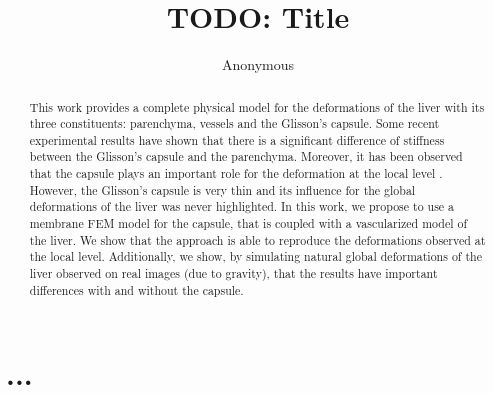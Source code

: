\documentclass{llncs}
\begin{document}
%
%
\mainmatter              %
%
\title{TODO: Title} %
%
%
\author{Anonymous}
%
%
%
\maketitle

\begin{abstract}
This work provides a complete physical model for the deformations of the liver with its three constituents: parenchyma, vessels and the Glisson's capsule.
Some recent experimental results \cite{Ahn2010} have shown that there is a significant difference of stiffness between the Glisson's capsule and the parenchyma. 
Moreover, it has been observed that the capsule plays an important role for the deformation at the local level \cite{Hollenstein2006}.
However, the Glisson's capsule is very thin and its influence for the global deformations of the liver was never highlighted.
In this work, we propose to use a membrane FEM model for the capsule, that is coupled with a vascularized model of the liver.
We show that the approach is able to reproduce the deformations observed at the local level.
Additionally, we show, by simulating natural global deformations of the liver observed on real images (due to gravity), that the results have important differences with and without the capsule.

\end{abstract}

\section{...}
\end{document}
